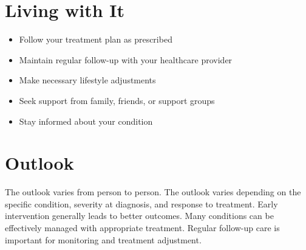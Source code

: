 \section{Living with It}
\begin{itemize}[noitemsep]
  \item Follow your treatment plan as prescribed
  \item Maintain regular follow-up with your healthcare provider
  \item Make necessary lifestyle adjustments
  \item Seek support from family, friends, or support groups
  \item Stay informed about your condition
\end{itemize}
\section{Outlook}
The outlook varies from person to person. The outlook varies depending on the specific condition, severity at diagnosis, and response to treatment. Early intervention generally leads to better outcomes. Many conditions can be effectively managed with appropriate treatment. Regular follow-up care is important for monitoring and treatment adjustment.
